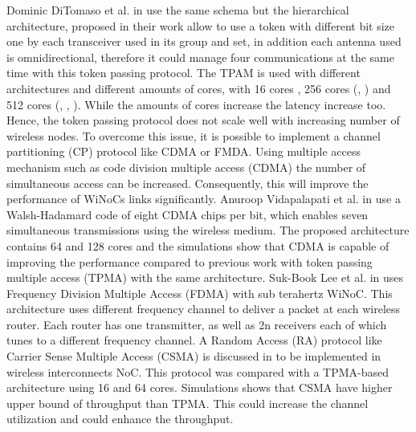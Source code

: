 \documentclass[12pt]{article}
\begin{document}
Dominic DiTomaso et al. in \citep{6041529} use the same schema but the hierarchical architecture, proposed in their work allow to use a token with different bit size one by each transceiver used in its group and set, in addition each antenna used is omnidirectional, therefore it could manage four communications at the same time with this token passing  protocol. The TPAM is used with different architectures and different amounts of cores, with 16 cores \citep{7459513}, 256 cores (\citep{7459514}, \citep{6041529})  and 512 cores (\citep {6302124}, \citep {5540799}, \citep {5551123}). While the amounts of cores increase the latency increase too. Hence, the token passing protocol does not scale well with increasing number of wireless nodes. To overcome this issue, it is possible to implement a channel partitioning (CP) protocol like CDMA or FMDA.  Using multiple access mechanism such as code division multiple access (CDMA) the number of simultaneous access can be increased. Consequently, this will improve the performance of WiNoCs links significantly. Anuroop Vidapalapati et al. in \citep{6272112} use a Walsh-Hadamard code of eight CDMA chips per bit, which enables seven simultaneous transmissions using the wireless medium. The proposed architecture contains 64 and 128 cores and the simulations show that CDMA is capable of improving the performance compared to previous work with token passing multiple access (TPMA) with the same architecture.
Suk-Book Lee et al. in \citep{lee2009scalable} uses Frequency Division Multiple Access (FDMA) with sub terahertz WiNoC. This architecture uses different frequency channel to deliver a packet at each wireless router. Each router has one transmitter, as well as 2n receivers each of which tunes to a different frequency channel. 
A Random Access (RA) protocol like Carrier Sense Multiple Access (CSMA) is discussed in \citep{7062254} to be implemented in wireless interconnects NoC. This protocol was compared with a TPMA-based architecture using 16 and 64 cores. Simulations shows that CSMA have higher upper bound of throughput than TPMA. This could increase the channel utilization and could enhance the throughput.


\medskip



\end{document}
